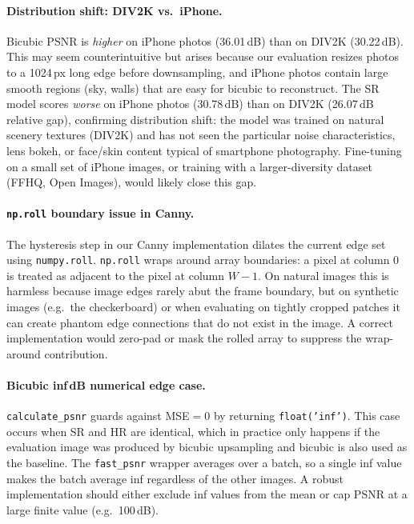 \documentclass{article}
\begin{document}
\paragraph{Distribution shift: DIV2K vs.\ iPhone.}
Bicubic PSNR is \emph{higher} on iPhone photos (36.01\,dB) than on DIV2K
(30.22\,dB).
This may seem counterintuitive but arises because our evaluation resizes
photos to a 1024\,px long edge before downsampling, and iPhone photos
contain large smooth regions (sky, walls) that are easy for bicubic to
reconstruct.
The SR model scores \emph{worse} on iPhone photos (30.78\,dB) than on DIV2K
(26.07\,dB relative gap), confirming distribution shift: the model was
trained on natural scenery textures (DIV2K) and has not seen the particular
noise characteristics, lens bokeh, or face/skin content typical of smartphone
photography.
Fine-tuning on a small set of iPhone images, or training with a
larger-diversity dataset (FFHQ, Open Images), would likely close this gap.

\paragraph{\texttt{np.roll} boundary issue in Canny.}
The hysteresis step in our Canny implementation dilates the current edge set
using \texttt{numpy.roll}.
\texttt{np.roll} wraps around array boundaries: a pixel at column 0 is treated
as adjacent to the pixel at column $W-1$.
On natural images this is harmless because image edges rarely abut the frame
boundary, but on synthetic images (e.g.\ the checkerboard) or when evaluating
on tightly cropped patches it can create phantom edge connections that do not
exist in the image.
A correct implementation would zero-pad or mask the rolled array to suppress
the wrap-around contribution.

\paragraph{Bicubic inf\,dB numerical edge case.}
\texttt{calculate\_psnr} guards against MSE$=0$ by returning
\texttt{float('inf')}.
This case occurs when SR and HR are identical, which in practice only happens
if the evaluation image was produced by bicubic upsampling and bicubic is also
used as the baseline.
The \texttt{fast\_psnr} wrapper averages over a batch, so a single inf value
makes the batch average inf regardless of the other images.
A robust implementation should either exclude inf values from the mean or cap
PSNR at a large finite value (e.g.\ 100\,dB).
\end{document}
